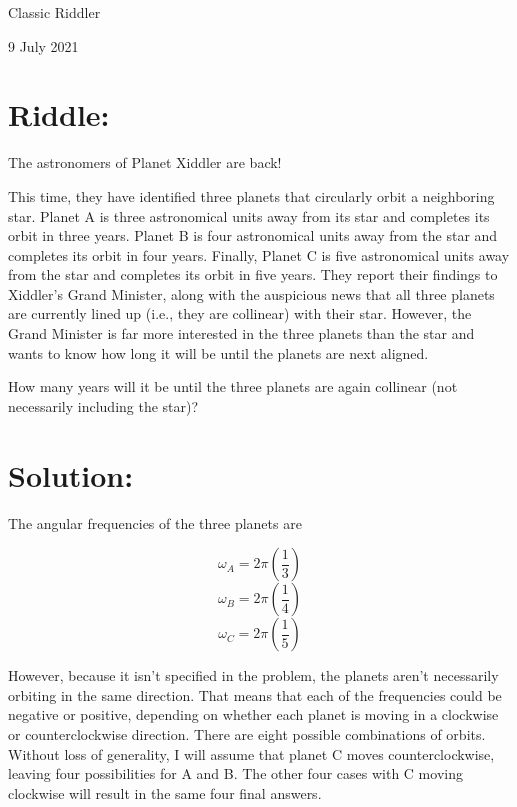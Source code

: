 \documentclass{article}
\begin{document}
\pagestyle{empty} %

\begin{center}
{\LARGE Classic Riddler}

\vspace{0.15in}

{\Large 9 July 2021}
\end{center}


\section*{Riddle:}

The astronomers of Planet Xiddler are back!

This time, they have identified three planets that circularly orbit a neighboring star.
Planet A is three astronomical units away from its star and completes its orbit in three years.
Planet B is four astronomical units away from the star and completes its orbit in four years.
Finally, Planet C is five astronomical units away from the star and completes its orbit in five years.
They report their findings to Xiddler's Grand Minister, along with the auspicious news that all three planets are currently lined up (i.e., they are collinear) with their star.
However, the Grand Minister is far more interested in the three planets than the star and wants to know how long it will be until the planets are next aligned.

How many years will it be until the three planets are again collinear (not necessarily including the star)?


\section*{Solution:}

The angular frequencies of the three planets are

\[
\omega_{A}=2\pi\left(\frac{1}{3}\right)
\]
\[
\omega_{B}=2\pi\left(\frac{1}{4}\right)
\]
\[
\omega_{C}=2\pi\left(\frac{1}{5}\right)
\]

However, because it isn't specified in the problem, the planets aren't necessarily orbiting in the same direction.
That means that each of the frequencies could be negative or positive, depending on whether each planet is moving in a clockwise or counterclockwise direction.
There are eight possible combinations of orbits.
Without loss of generality, I will assume that planet C moves counterclockwise, leaving four possibilities for A and B.
The other four cases with C moving clockwise will result in the same four final answers.
\end{document}
